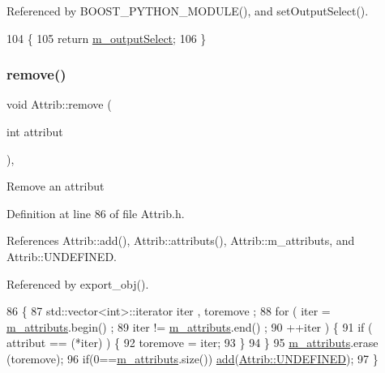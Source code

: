 Referenced by B\+O\+O\+S\+T\+\_\+\+P\+Y\+T\+H\+O\+N\+\_\+\+M\+O\+D\+U\+L\+E(), and set\+Output\+Select().


\begin{DoxyCode}
104                     \{
105     \textcolor{keywordflow}{return} \hyperlink{classIOdata_acc46d71243b542e68277e242effa7f1b}{m\_outputSelect};
106   \}
\end{DoxyCode}
\mbox{\label{classAttrib_a7d4ef7e32d93cb287792b87b857e79f3}} 
\subsubsection{\texorpdfstring{remove()}{remove()}}
{\footnotesize\ttfamily void Attrib\+::remove (\begin{DoxyParamCaption}\item[{int}]{attribut }\end{DoxyParamCaption})\hspace{0.3cm}{\ttfamily [inline]}, {\ttfamily [inherited]}}

Remove an attribut 

Definition at line 86 of file Attrib.\+h.



References Attrib\+::add(), Attrib\+::attributs(), Attrib\+::m\+\_\+attributs, and Attrib\+::\+U\+N\+D\+E\+F\+I\+N\+ED.



Referenced by export\+\_\+obj().


\begin{DoxyCode}
86                                \{
87     std::vector<int>::iterator iter , toremove ;
88     \textcolor{keywordflow}{for} ( iter  = \hyperlink{classAttrib_ac4bd58a0cc6b38a3b711d609a3d3aacc}{m\_attributs}.begin() ;
89           iter != \hyperlink{classAttrib_ac4bd58a0cc6b38a3b711d609a3d3aacc}{m\_attributs}.end()   ;
90           ++iter ) \{
91       \textcolor{keywordflow}{if} ( attribut == (*iter) ) \{
92         toremove = iter;
93       \}
94     \}
95     \hyperlink{classAttrib_ac4bd58a0cc6b38a3b711d609a3d3aacc}{m\_attributs}.erase (toremove);
96     \textcolor{keywordflow}{if}(0==\hyperlink{classAttrib_ac4bd58a0cc6b38a3b711d609a3d3aacc}{m\_attributs}.size()) \hyperlink{classAttrib_a235f773af19c900264a190b00a3b4ad7}{add}(\hyperlink{classAttrib_a69e171d7cc6417835a5a306d3c764235a3a8da2ab97dda18aebab196fe4100531}{Attrib::UNDEFINED});
97   \}
\end{DoxyCode}
\mbox{\label{classIOdata_af98cbfbc28346ebb9b64ca0203af1463}} 
